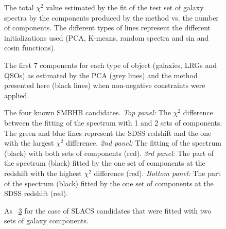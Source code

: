 \documentclass[12pt,preprint]{aastex}
\begin{document}
\clearpage
\begin{figure}
\caption{The total $\chi^2$ value estimated by the fit of the test set
  of galaxy spectra by the components produced by the method vs. the
  number of components. The different types of lines represent the
  different initializations used (PCA, K-means, random spectra and sin
  and cosin functions).}
\label{fig:4}
\end{figure}

\clearpage
\begin{figure}
\begin{center}
\caption{The first 7 components for each type of object (galaxies,
  LRGs and QSOs) as estimated by the PCA (grey lines) and the method
  presented here (black lines) when non-negative constraints were
  applied.}
\label{fig:5}
\end{center}
\end{figure}

\clearpage
\begin{figure}
\caption{The four known SMBHB candidates. \textsl{Top panel:} The
  $\chi^2$ difference between the fitting of the spectrum with 1 and 2
  sets of components. The green and blue lines represent the SDSS
  redshift and the one with the largest $\chi^2$
  difference. \textsl{2nd panel:} The fitting of the spectrum (black)
  with both sets of components (red). \textsl{3rd panel:} The part of
  the spectrum (black) fitted by the one set of components at the
  redshift with the highest $\chi^2$ difference (red). \textsl{Bottom
    panel:} The part of the spectrum (black) fitted by the one set of
  components at the SDSS redshift (red).}
\label{fig:6a}
\end{figure}

\clearpage
\begin{figure}
\caption{As \figurename~\ref{fig:6a} for the case of SLACS candidates
  that were fitted with two sets of galaxy components.}
\label{fig:6}
\end{figure}
\end{document}

